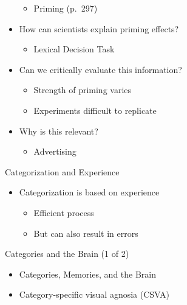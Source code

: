 \documentclass[
]{book}
\providecommand{\tightlist}{%
  \setlength{\itemsep}{0pt}\setlength{\parskip}{0pt}}
\begin{document}
\begin{reflect}
\begin{itemize}
  \begin{itemize}
  \tightlist
  \item
    Priming (p.~297)\\
  \end{itemize}
\item
  How can scientists explain priming effects?

  \begin{itemize}
  \tightlist
  \item
    Lexical Decision Task\\
  \end{itemize}
\item
  Can we critically evaluate this information?

  \begin{itemize}
  \tightlist
  \item
    Strength of priming varies\\
  \item
    Experiments difficult to replicate\\
  \end{itemize}
\item
  Why is this relevant?

  \begin{itemize}
  \tightlist
  \item
    Advertising
  \end{itemize}
\end{itemize}

Categorization and Experience

\begin{itemize}
\tightlist
\item
  Categorization is based on experience

  \begin{itemize}
  \tightlist
  \item
    Efficient process\\
  \item
    But can also result in errors
  \end{itemize}
\end{itemize}

Categories and the Brain (1 of 2)

\begin{itemize}
\tightlist
\item
  Categories, Memories, and the Brain\\
\item
  Category-specific visual agnosia (CSVA)


\end{itemize}
\end{reflect}
\end{document}
